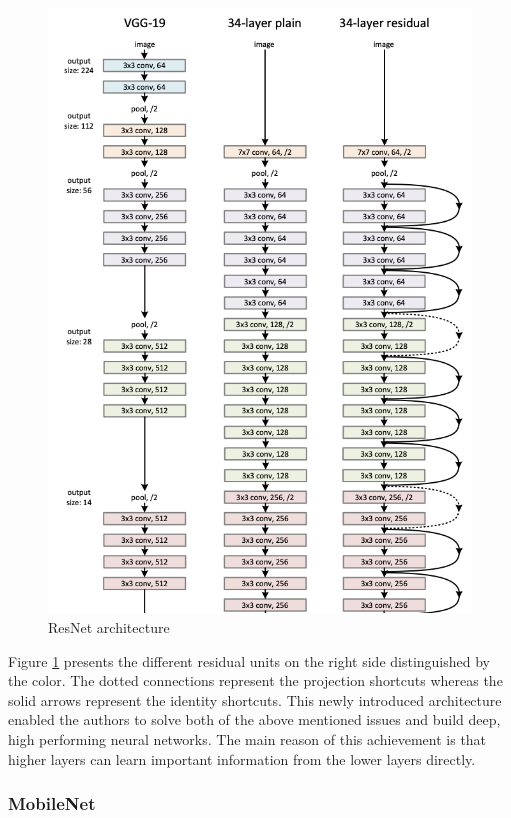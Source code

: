 \begin{figure}[ht]
  \centering
  \includegraphics[width=\linewidth]{figures/resnet.png}
  \caption{ResNet architecture}
  \label{fig:resnet}
\end{figure}

Figure \ref{fig:resnet} presents the different residual units on the right side distinguished by the color. The dotted connections represent the projection shortcuts whereas the solid arrows represent the identity shortcuts.
This newly introduced architecture enabled the authors to solve both of the above mentioned issues and build deep, high performing neural networks. The main reason of this achievement is that higher layers can learn important information from the lower layers directly.

\subsubsection{MobileNet}\label{mobilenet}

